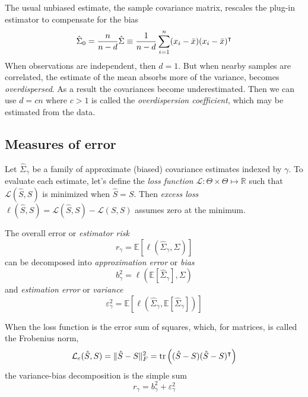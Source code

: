 The usual unbiased estimate, the sample covariance matrix, rescales the plug-in estimator to compensate for the bias
\begin{equation}
\hat\Sigma_0 = \frac n {n - d} \hat\Sigma \equiv \frac 1 {n-d} \sum\limits_{i=1}^n (x_i - \bar x) (x_i - \bar x)^\intercal
\end{equation}
When observations are independent, then $d=1$.  But when nearby samples are correlated, the estimate of the mean absorbs more of the variance, becomes \emph{overdispersed}. As a result the covariances become underestimated. Then we can use $d=cn$ where $c>1$ is called the \emph{overdispersion coefficient}, which may be estimated from the data.

\subsection{Measures of error}
Let $\hat\Sigma_\gamma$ be a family of approximate (biased) covariance estimates indexed by $\gamma$. To evaluate each estimate, let's define the \emph{loss function} $\mathcal L : \Theta \times \Theta \mapsto \mathbb R$ such that $\mathcal L(\hat S,S)$ is minimized when $\hat S = S$.  Then \emph{excess loss} $\ell(\hat S, S) = \mathcal L(\hat S, S) - \mathcal L(S,S)$ assumes zero at the minimum. 

The overall error or \emph{estimator risk} 
\begin{equation}
r_\gamma = \mathbb E\left[ \ell\left(\hat\Sigma_\gamma,\Sigma\right) \right]
\end{equation}
can be decomposed into \emph{approximation error} or \emph{bias}   
\begin{equation}
b_\gamma^2 = \ell \left( \mathbb E\left[\hat \Sigma_\gamma\right],\Sigma\right)
\end{equation}
and \emph{estimation error} or \emph{variance}
\begin{equation}
\varepsilon_\gamma^2 = \mathbb E \left[ \ell\left(\hat \Sigma_\gamma, 
\mathbb E\left[\hat \Sigma_\gamma\right]\right) \right]
\end{equation}

When the loss function is the error sum of squares, which, for matrices, is called the Frobenius norm, 
\begin{equation}
\mathcal L_e(\hat S,S) = \|\hat S-S\|_F^2 = \operatorname{tr}\left((\hat S-S)(\hat S-S)^\intercal\right)
\end{equation}
the variance-bias decomposition is the simple sum
\begin{equation}
r_\gamma =  b_\gamma^2 + \varepsilon_\gamma^2
\end{equation}

